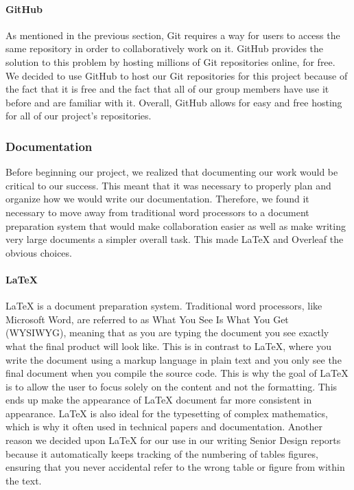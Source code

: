 \paragraph{GitHub}
As mentioned in the previous section, Git requires a way for users to access the same repository in order to collaboratively work on it. GitHub provides the solution to this problem by hosting millions of Git repositories online, for free. We decided to use GitHub to host our Git repositories for this project because of the fact that it is free and the fact that all of our group members have use it before and are familiar with it. Overall, GitHub allows for easy and free hosting for all of our project's repositories.

\subsubsection{Documentation}
Before beginning our project, we realized that documenting our work would be critical to our success. This meant that it was necessary to properly plan and organize how we would write our documentation. Therefore, we found it necessary to move away from traditional word processors to a document preparation system that would make collaboration easier as well as make writing very large documents a simpler overall task. This made LaTeX and Overleaf the obvious choices.

\paragraph{LaTeX}
LaTeX is a document preparation system. Traditional word processors, like Microsoft Word, are referred to as What You See Is What You Get (WYSIWYG), meaning that as you are typing the document you see exactly what the final product will look like. This is in contrast to LaTeX, where you write the document using a markup language in plain text and you only see the final document when you compile the source code. This is why the goal of LaTeX is to allow the user to focus solely on the content and not the formatting. This ends up make the appearance of LaTeX document far more consistent in appearance. LaTeX is also ideal for the typesetting of complex mathematics, which is why it often used in technical papers and documentation. Another reason we decided upon LaTeX for our use in our writing Senior Design reports because it automatically keeps tracking of the numbering of tables figures, ensuring that you never accidental refer to the wrong table or figure from within the text. 

